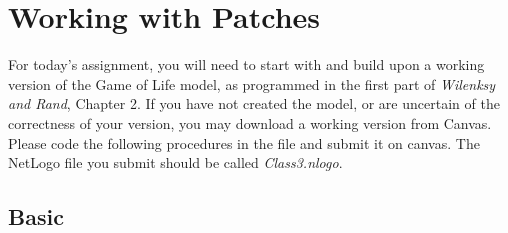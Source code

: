 \documentclass[11pt,oneside]{book}
\begin{document}
\chapter{Working with Patches}

For today's assignment, you will need to start with and build upon a working version of the Game of Life model, as programmed in the first part of {\it Wilenksy and Rand}, Chapter 2. If you have not created the model, or are uncertain of the correctness of your version, you may download a working version from Canvas. Please code the following procedures in the file and submit it on canvas. The NetLogo file you submit should be called {\it Class3.nlogo}.

\section{Basic}
\end{document}
